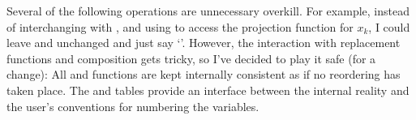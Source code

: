 Several of the following operations are unnecessary overkill. For
example,
instead of interchanging  with , and
using
 to access the projection function for
$x_k$,
I could leave  and  unchanged and
just say
`'. However, the interaction with replacement functions
and composition gets tricky, so I've decided to play it safe (for a change):
All  and  functions are kept internally consistent as
if
no reordering has taken place. The  and  tables
provide
an interface between the internal reality and the user's conventions
for numbering the variables.


